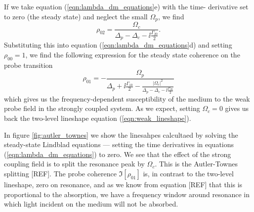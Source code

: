     If we take equation (\ref{eqn:lambda_dm_equations}e) with the time-
    derivative set to zero (\ie the steady state) and neglect the small
    $\Omega_p$, we find
    \begin{equation}
      \rho_{02} = \frac{\Omega_c}{\Delta_p - \Delta_c 
      - \ii \tfrac{\Gamma_{20}}{2}}.
    \end{equation}
    Substituting this into equation (\ref{eqn:lambda_dm_equations}d) and setting
    $\rho_{00} = 1$, we find the following expression for the steady state
    coherence on the probe transition
    \begin{equation}
      \rho_{01} = - \frac{\Omega_p}{\Delta_p + \ii \tfrac{\Gamma_{10}}{2} - 
      \frac{\left| \Omega_c \right|^2 }{\Delta_p - \Delta_c - 
      \ii \tfrac{\Gamma_{20}}{2}}}
    \end{equation}
    which gives us the frequency-dependent susceptibility of the medium to the
    weak probe field in the strongly coupled system. As we expect, setting
    $\Omega_c = 0$ gives us back the two-level lineshape equation
    (\ref{eqn:weak_lineshape}).

    In figure \ref{fig:autler_townes} we show the linesahpes calcultaed by
    solving the steady-state Lindblad equations --- \ie setting the time
    derivatives in equations (\ref{eqn:lambda_dm_equations}) to zero. We see
    that the effect of the strong coupling field is to split the resonance peak
    by $\Omega_c$. This is the Autler-Townes splitting [REF]. The probe
    coherence $\Im \left[ \rho_{01} \right]$ is, in contrast to the two-level
    lineshape, zero on resonance, and as we know from equation [REF] that this
    is proportional to the absorption, we have a frequency window around
    resonance in which light incident on the medium will not be absorbed.


